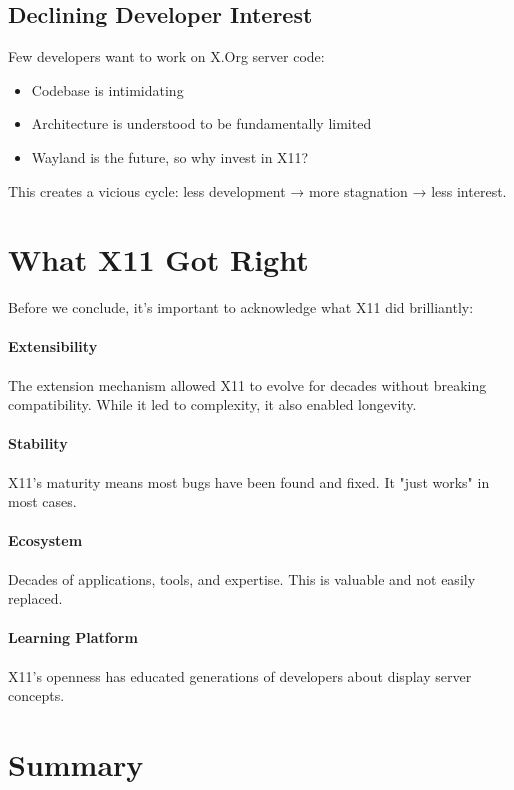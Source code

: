 \subsection{Declining Developer Interest}

Few developers want to work on X.Org server code:
\begin{itemize}
    \item Codebase is intimidating
    \item Architecture is understood to be fundamentally limited
    \item Wayland is the future, so why invest in X11?
\end{itemize}

This creates a vicious cycle: less development → more stagnation → less interest.

\section{What X11 Got Right}

Before we conclude, it's important to acknowledge what X11 did brilliantly:

\paragraph{Extensibility}
The extension mechanism allowed X11 to evolve for decades without breaking compatibility. While it led to complexity, it also enabled longevity.

\paragraph{Stability}
X11's maturity means most bugs have been found and fixed. It "just works" in most cases.

\paragraph{Ecosystem}
Decades of applications, tools, and expertise. This is valuable and not easily replaced.

\paragraph{Learning Platform}
X11's openness has educated generations of developers about display server concepts.

\section{Summary}


